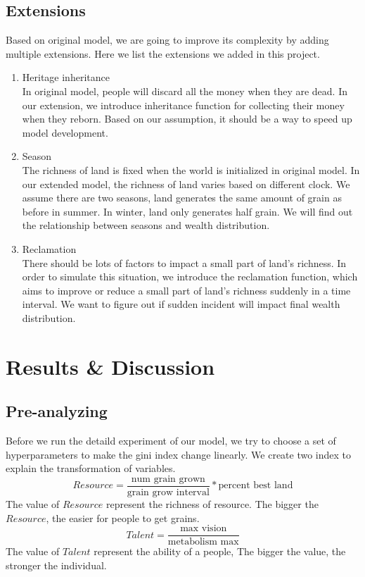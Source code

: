 \subsection{Extensions}
Based on original model, we are going to improve its complexity by adding multiple extensions. Here we list the extensions we added in this project. 
\begin{enumerate}
	\item Heritage inheritance\\
	In original model, people will discard all the money when they are dead. In our extension, we introduce inheritance function for collecting their money when they reborn. Based on our assumption, it should be a way to speed up model development. 
	\item Season\\
	The richness of land is fixed when the world is initialized in original model. In our extended model, the richness of land varies based on different clock. We assume there are two seasons, land generates the same amount of grain as before in summer. In winter, land only generates half grain. We will find out the relationship between seasons and wealth distribution.
	\item Reclamation\\
	There should be lots of factors to impact a small part of land's richness. In order to simulate this situation, we introduce the reclamation function, which aims to improve or reduce a small part of land's richness suddenly in a time interval. We want to figure out if sudden incident will impact final wealth distribution.
\end{enumerate}
\section{Results \& Discussion}
\subsection{Pre-analyzing}
Before we run the detaild experiment of our model, we try to choose a set of hyperparameters to make the gini index change linearly. We create two index to explain the transformation of variables.\\
$$
Resource = \frac {\text {num grain grown}}{\text{grain grow interval}} * \text{percent best land} 
$$
The value of $Resource$ represent the richness of resource. The bigger the $Resource$, the easier for people to get grains.
$$
Talent = \frac {\text{max vision}}{\text{metabolism max}}
$$
The value of $Talent$ represent the ability of a people, The bigger the value, the stronger the individual.
